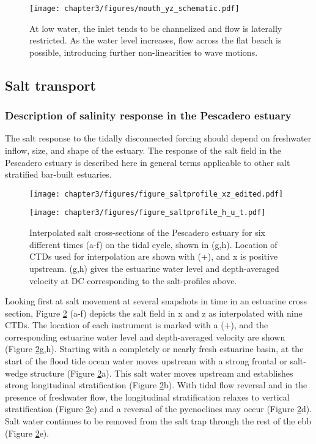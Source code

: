 \begin{figure}
\centering
\texttt{[image: chapter3/figures/mouth\_yz\_schematic.pdf]} \caption{At low water, the inlet tends to be channelized and flow is laterally
restricted. As the water level increases, flow across the flat beach
is possible, introducing further non-linearities to wave motions.} \label{f10_mouth_yz}

\end{figure}



\subsection{Salt transport}


\subsubsection{Description of salinity response in the Pescadero estuary}

The salt response to the tidally disconnected forcing should depend
on freshwater inflow, size, and shape of the estuary. The response
of the salt field in the Pescadero estuary is described here in general
terms applicable to other salt stratified bar-built estuaries.

\begin{figure}
\texttt{[image: chapter3/figures/figure\_saltprofile\_xz\_edited.pdf]}

\texttt{[image: chapter3/figures/figure\_saltprofile\_h\_u\_t.pdf]}

\protect\caption{Interpolated salt cross-sections of the Pescadero estuary for six
different times (a-f) on the tidal cycle, shown in (g,h). Location
of CTDs used for interpolation are shown with (+), and x is positive
upstream. (g,h) gives the estuarine water level and depth-averaged
velocity at DC corresponding to the salt-profiles above. \label{f10_Sxz}}
\end{figure}


Looking first at salt movement at several snapshots in time in an
estuarine cross section, Figure \ref{f10_Sxz} (a-f) depicts the salt
field in x and z as interpolated with nine CTDs. The location of each
instrument is marked with a (+), and the corresponding estuarine water
level and depth-averaged velocity are shown (Figure \ref{f10_Sxz}g,h).
Starting with a completely or nearly fresh estuarine basin, at the
start of the flood tide ocean water moves upstream with a strong frontal
or salt-wedge structure (Figure \ref{f10_Sxz}a). This salt water
moves upstream and establishes strong longitudinal stratification
(Figure \ref{f10_Sxz}b). With tidal flow reversal and in the presence
of freshwater flow, the longitudinal stratification relaxes to vertical
stratification (Figure \ref{f10_Sxz}c) and a reversal of the pycnoclines
may occur (Figure \ref{f10_Sxz}d). Salt water continues to be removed
from the salt trap through the rest of the ebb (Figure \ref{f10_Sxz}e).



